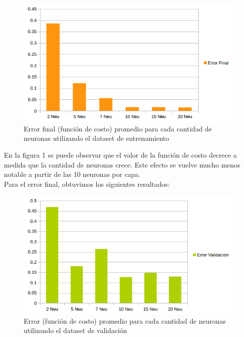 \begin{figure}[h]
  \begin{center}
  \includegraphics[scale=0.8]{graficos/fig1_cant_neuro_error_final.png}
  \caption{Error final (función de costo) promedio para cada cantidad de neuronas utilizando el dataset de entrenamiento}
  \end{center}
\end{figure}

En la figura 1 se puede observar que el valor de la función de costo decrece a medida que la cantidad
de neuronas crece. Este efecto se vuelve mucho menos notable a partir de las 10 neuronas por capa.\\

Para el error final, obtuvimos los siguientes resultados:

\begin{figure}[h]
  \begin{center}
  \includegraphics[scale=0.8]{graficos/fig2_cant_neuro_error_valid.png}
  \caption{Error (función de costo) promedio para cada cantidad de neuronas utilizando el dataset de validación}
  \end{center}
\end{figure}

